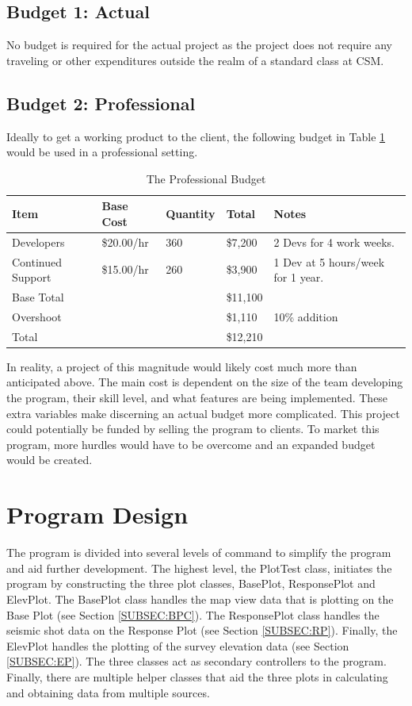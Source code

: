 \documentclass[12pt]{article}
\begin{document}
\subsection{Budget 1: Actual}

No budget is required for the actual project as the project does not require any traveling or other expenditures outside the realm of a standard class at CSM.

\subsection{Budget 2: Professional}

Ideally to get a working product to the client, the following budget in Table \ref{TAB:BUG} would be used in a professional setting. 

\begin{table}[h]
\caption{The Professional Budget}
\begin{tabular}{ l | l | l || l | l}
  \hline                        
  Item & Base Cost & Quantity & Total & Notes \\ \hline
  Developers & \$20.00/hr & 360 & \$7,200 & 2 Devs for 4 work weeks.\\
  Continued Support & \$15.00/hr & 260 & \$3,900 & 1 Dev at 5 hours/week for 1 year.\\ \hline
  Base Total & & & \$11,100 & \\
  Overshoot & & & \$1,110 & 10\% addition\\ \hline
  Total & & & \$12,210 & \\
  \hline  
\end{tabular} 
\label{TAB:BUG}
\end{table}

In reality, a project of this magnitude would likely cost much more than anticipated above. The main cost is dependent on the size of the team developing the program, their skill level, and what features are being implemented. These extra variables make discerning an actual budget more complicated. This project could potentially be funded by selling the program to clients. To market this program, more hurdles would have to be overcome and an expanded budget would be created.

\section{Program Design}

The program is divided into several levels of command to simplify the program and aid further development. The highest level, the PlotTest class, initiates the program by constructing the three plot classes, BasePlot, ResponsePlot and ElevPlot. The BasePlot class handles the map view data that is plotting on the Base Plot (see Section \ref{SUBSEC:BPC}). The ResponsePlot class handles the seismic shot data on the Response Plot (see Section \ref{SUBSEC:RP}). Finally, the ElevPlot handles the plotting of the survey elevation data (see Section \ref{SUBSEC:EP}). The three classes act as secondary controllers to the program. Finally, there are multiple helper classes that aid the three plots in calculating and obtaining data from multiple sources. \\
\end{document}
